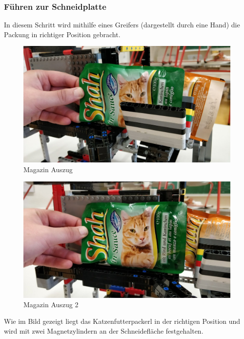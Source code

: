 \newpage 

\subsubsection{Führen zur Schneidplatte}

In diesem Schritt wird mithilfe eines Greifers (dargestellt durch eine Hand) die Packung in richtiger Position gebracht.

\begin{figure}[H]
\begin{center}
\includegraphics[width=13cm]{Bilder/Ablauf_1_png/Magazin_Auszug.jpeg}
\caption{Magazin Auszug}
\end{center}
\end{figure}

\begin{figure}[H]
\begin{center}
\includegraphics[width=13cm]{Bilder/Ablauf_1_png/Magazin_Auszug_2.jpeg}
\caption{Magazin Auszug 2}
\end{center}
\end{figure}

Wie im Bild gezeigt liegt das Katzenfutterpackerl in der richtigen Position und wird mit zwei Magnetzylindern an der Schneidefläche festgehalten.

